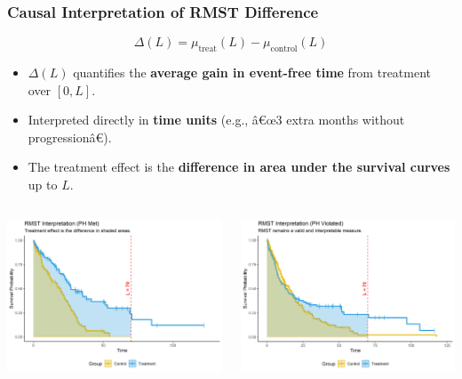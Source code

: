 \documentclass{beamer}
\begin{document}
\begin{frame}
\frametitle{Causal Interpretation of RMST Difference}
\begin{block}{}
\[
\Delta(L) = \mu_{\text{treat}}(L) - \mu_{\text{control}}(L)
\]

\begin{itemize}
  \item $\Delta(L)$ quantifies the \textbf{average gain in event-free time} from treatment over $[0,L]$.  
  \item Interpreted directly in \textbf{time units} (e.g., â€œ3 extra months without progressionâ€).  
  \item The treatment effect is the \textbf{difference in area under the survival curves} up to $L$.  
\end{itemize}
\end{block}

\begin{columns}[T,onlytextwidth]
  \begin{column}{0.5\textwidth}
    \centering
    \includegraphics[width=\textwidth, height=0.7\textwidth]{images/rmst_causal_plot_ph_met.png}
  \end{column}
  \begin{column}{0.5\textwidth}
    \centering
    \includegraphics[width=\textwidth, height=0.7\textwidth]{images/rmst_causal_plot_ph_violated.png}
  \end{column}
\end{columns}


\end{frame}
\end{document}

